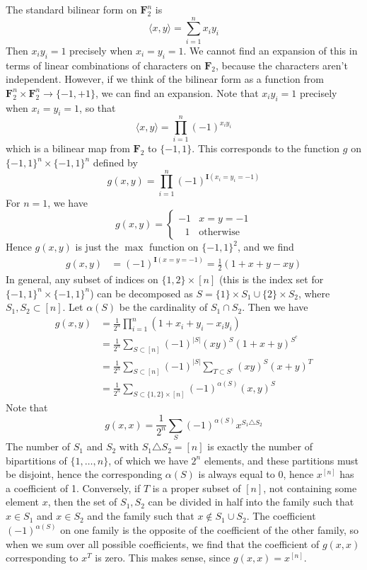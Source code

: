 \begin{example}
    The standard bilinear form on $\mathbf{F}_2^n$ is
    \[ \langle x,y \rangle = \sum_{i = 1}^n x_iy_i \]
    Then $x_iy_i = 1$ precisely when $x_i = y_i = 1$. We cannot find an expansion of this in terms of linear combinations of characters on $\mathbf{F}_2$, because the characters aren't independent. However, if we think of the bilinear form as a function from $\mathbf{F}_2^n \times \mathbf{F}_2^n \to \{ -1, +1 \}$, we can find an expansion. Note that $x_iy_i = 1$ precisely when $x_i = y_i = 1$, so that
    \[ \langle x, y \rangle = \prod_{i = 1}^n (-1)^{x_iy_i} \]
    which is a bilinear map from $\mathbf{F}_2$ to $\{ -1, 1 \}$. This corresponds to the function $g$ on $\{ -1, 1 \}^n \times \{ -1, 1 \}^n$ defined by
    \[ g(x,y) = \prod_{i = 1}^n (-1)^{\mathbf{I}(x_i = y_i = -1)} \]
    For $n = 1$, we have
    \[ g(x,y) = \begin{cases} -1 & x = y = -1 \\ \ \ \ 1 & \text{otherwise} \end{cases} \]
    Hence $g(x,y)$ is just the $\max$ function on $\{ -1, 1 \}^2$, and we find
    \begin{align*}
        g(x,y) &= (-1)^{\mathbf{I}(x = y = -1)} = \frac{1}{2} (1 + x + y - xy)
    \end{align*}
    In general, any subset of indices on $\{ 1, 2 \} \times [n]$ (this is the index set for $\{ -1, 1 \}^n \times \{ -1, 1 \}^n$) can be decomposed as $S = \{ 1 \} \times S_1 \cup \{ 2 \} \times S_2$, where $S_1, S_2 \subset [n]$. Let $\alpha(S)$ be the cardinality of $S_1 \cap S_2$. Then we have
    \begin{align*}
        g(x,y) &= \frac{1}{2^n} \prod_{i = 1}^n (1 + x_i + y_i - x_iy_i)\\
        &= \frac{1}{2^n} \sum_{S \subset [n]} (-1)^{|S|} (xy)^S (1 + x + y)^{S^c}\\
        &= \frac{1}{2^n} \sum_{S \subset [n]} (-1)^{|S|} \sum_{T \subset S^c} (xy)^S (x + y)^T\\
        &= \frac{1}{2^n} \sum_{S \subset \{ 1, 2 \} \times [n]} (-1)^{\alpha(S)} (x,y)^S
    \end{align*}
    Note that
    \[ g(x,x) = \frac{1}{2^n} \sum_S (-1)^{\alpha(S)} x^{S_1 \triangle S_2} \]
    The number of $S_1$ and $S_2$ with $S_1 \triangle S_2 = [n]$ is exactly the number of bipartitions of $\{ 1, \dots, n \}$, of which we have $2^n$ elements, and these partitions must be disjoint, hence the corresponding $\alpha(S)$ is always equal to 0, hence $x^{[n]}$ has a coefficient of 1. Conversely, if $T$ is a proper subset of $[n]$, not containing some element $x$, then the set of $S_1,S_2$ can be divided in half into the family such that $x \in S_1$ and $x \in S_2$ and the family such that $x \not \in S_1 \cup S_2$. The coefficient $(-1)^{\alpha(S)}$ on one family is the opposite of the coefficient of the other family, so when we sum over all possible coefficients, we find that the coefficient of $g(x,x)$ corresponding to $x^T$ is zero. This makes sense, since $g(x,x) = x^{[n]}$.
\end{example}

